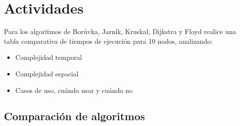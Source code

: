 \documentclass{article}
\begin{document}
    \section{Actividades}

        Para los algoritmos de Bor\r{u}vka, Jarník, Kruskal, Dijkstra y Floyd
        realice una tabla comparativa de tiempos de ejecución para 10 nodos,
        analizando:

        \begin{itemize}
        \item Complejidad temporal
        \item Complejidad espacial
        \item Casos de uso, cuándo usar y cuándo no
        \end{itemize}

    \subsection{Comparación de algoritmos}
\end{document}
